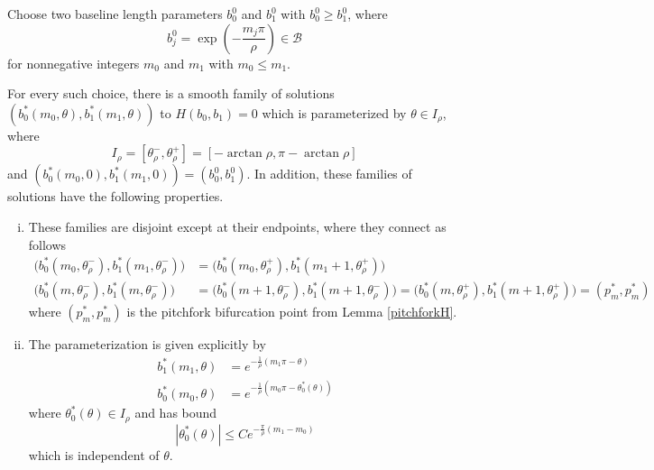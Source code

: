 \documentclass[thesis.tex]{subfiles}
\begin{document}

\begin{lemma}\label{thetaparamlemma}
Choose two baseline length parameters $b_0^0$ and $b_1^0$ with $b_0^0 \geq b_1^0$, where
\[
b_j^0 = \exp\left(-\frac{m_j \pi}{\rho}\right) \in \mathcal{B}
\]
for nonnegative integers $m_0$ and $m_1$ with $m_0 \leq m_1$. 

For every such choice, there is a smooth family of solutions $( b_0^*(m_0, \theta), b_1^*(m_1, \theta) )$ to $H(b_0, b_1) = 0$ which is parameterized by $\theta \in I_\rho$, where
\begin{equation}\label{Irho}
I_\rho = [\theta_\rho^-, \theta_\rho^+] = [-\arctan \rho,\pi - \arctan \rho] 
\end{equation}
and $(b_0^*(m_0, 0), b_1^*(m_1, 0)) = (b_0^0, b_1^0)$. In addition, these families of solutions have the following properties.

\begin{enumerate}[(i)]
\item These families are disjoint except at their endpoints, where they connect as follows
\begin{align*}
\Big( b_0^*(m_0, \theta_\rho^-), b_1^*(m_1, \theta_\rho^-) \Big) &= \Big( b_0^*(m_0, \theta_\rho^+), b_1^*(m_1+1, \theta_\rho^+) \Big) \\
\Big( b_0^*(m, \theta_\rho^-), b_1^*(m, \theta_\rho^-) \Big) &= \Big( b_0^*(m+1, \theta_\rho^-), b_1^*(m+1, \theta_\rho^-) \Big) = \Big( b_0^*(m, \theta_\rho^+), b_1^*(m+1, \theta_\rho^+) \Big) = (p^*_m, p^*_m)
\end{align*}
where $(p^*_m, p^*_m)$ is the pitchfork bifurcation point from Lemma \ref{pitchforkH}.

\item The parameterization is given explicitly by
\begin{equation}\label{thetaparam}
\begin{aligned}
b_1^*(m_1, \theta) &= e^{-\frac{1}{\rho}(m_1 \pi - \theta) } \\
b_0^*(m_0, \theta) &= e^{-\frac{1}{\rho}(m_0 \pi - \theta_0^*(\theta)) }
\end{aligned}
\end{equation}
where $\theta_0^*(\theta) \in I_\rho$ and has bound
\begin{equation}\label{thetastarbound}
|\theta_0^*(\theta)| \leq C e^{ -\frac{\pi}{\rho}(m_1 - m_0)}
\end{equation}
which is independent of $\theta$.
\end{enumerate}


\end{lemma}
\end{document}
